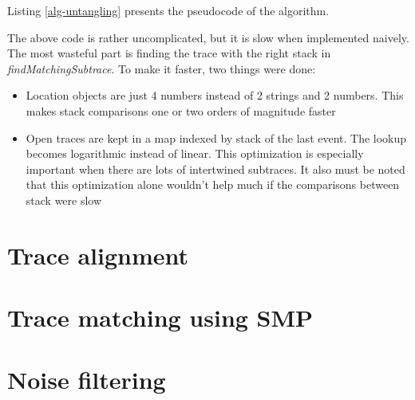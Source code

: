 Listing \ref{alg-untangling} presents the pseudocode of the algorithm.



The above code is rather uncomplicated, but it is slow when implemented naively.
The most wasteful part is finding the trace with the right stack in \emph{findMatchingSubtrace}.
To make it faster, two things were done:
\begin{itemize}
  \item Location objects are just 4 numbers instead of 2 strings and 2 numbers. This makes stack comparisons
           one or two orders of magnitude faster
  \item Open traces are kept in a map indexed by stack of the last event. 
  			The lookup becomes logarithmic instead of linear. This optimization is especially important when there are lots
  			of intertwined subtraces. It also must be noted that this optimization alone wouldn't help much if the comparisons 
  			between stack were slow
\end{itemize} 

\section{Trace alignment}
\label{trace-alignment}

\cite{ieee:alignment-and-slicing}

\section{Trace matching using SMP}

\section{Noise filtering}


